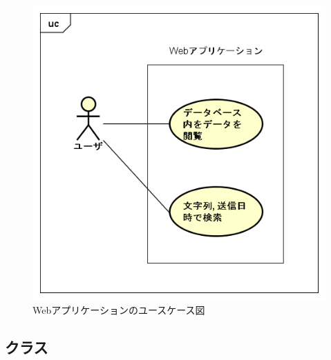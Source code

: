 \begin{figure}
\begin{center}
\includegraphics[width=14cm]{fig/usecase_web.png}
\end{center}
\caption{Webアプリケーションのユースケース図}
\end{figure}

\subsection{クラス}
